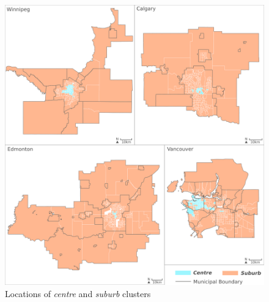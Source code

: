 \begin{figure}[H]
	\centering
	\includegraphics[width=6in]{figures/E_mini_2.png}
	\caption{Locations of \textit{centre} and \textit{suburb} clusters}
	\label{fig:mm1}
\end{figure}




